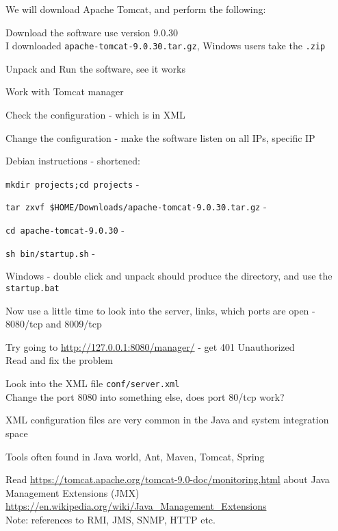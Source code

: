 \documentclass[Screen16to9,17pt]{foils}
\begin{document}

We will download Apache Tomcat, and perform the following:
\begin{list2}
\item Download the software use version 9.0.30\\
I downloaded \verb+apache-tomcat-9.0.30.tar.gz+, Windows users take the \verb+.zip+
\item Unpack and Run the software, see it works
\item Work with Tomcat manager
\item Check the configuration - which is in XML
\item Change the configuration - make the software listen on all IPs, specific IP
\end{list2}







Debian instructions - shortened:
\begin{list2}
\item \verb+mkdir projects;cd projects+ -
\item \verb+tar zxvf $HOME/Downloads/apache-tomcat-9.0.30.tar.gz+ -
\item \verb+cd apache-tomcat-9.0.30+ -
\item \verb+sh bin/startup.sh+ -
\end{list2}

Windows - double click and unpack should produce the directory, and use the \verb+startup.bat+



Now use a little time to look into the server, links, which ports are open - 8080/tcp and 8009/tcp





\begin{list2}
\item Try going to \url{http://127.0.0.1:8080/manager/} - get 401 Unauthorized\\
Read and fix the problem
\item Look into the XML file \verb+conf/server.xml+\\
Change the port 8080 into something else, does port 80/tcp work?
\item XML configuration files are very common in the Java and system integration space
\item Tools often found in Java world, Ant, Maven, Tomcat, Spring
\item Read \url{https://tomcat.apache.org/tomcat-9.0-doc/monitoring.html} about Java Management Extensions (JMX) \url{https://en.wikipedia.org/wiki/Java_Management_Extensions}\\
Note: references to RMI, JMS, SNMP, HTTP etc.
\end{list2}
\end{document}
